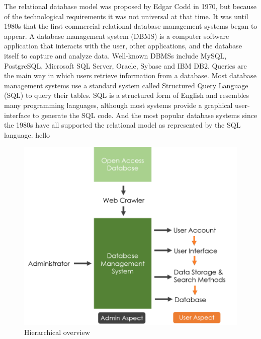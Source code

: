 The relational database model was proposed by Edgar Codd in 1970, but because of the technological requirements it was not universal at that time. It was until 1980s that the first commercial relational database management systems began to appear. 
A database management system (DBMS) is a computer software application that interacts with the user, other applications, and the database itself to capture and analyze data. Well-known DBMSs include MySQL, PostgreSQL, Microsoft SQL Server, Oracle, Sybase and IBM DB2. 
Queries are the main way in which users retrieve information from a database. Most database management systems use a standard system called Structured Query Language (SQL) to query their tables. SQL is a structured form of English and resembles many programming languages, although most systems provide a graphical user-interface to generate the SQL code. And the most popular database systems since the 1980s have all supported the relational model as represented by the SQL language.\cite{Martinez-Cruz2011} hello	
	
\begin{figure}[h]
	\begin{center}
		\includegraphics[scale=1.0]{WolverineChart}
	\end{center}
	\caption{Hierarchical overview}
\end{figure}
\clearpage
